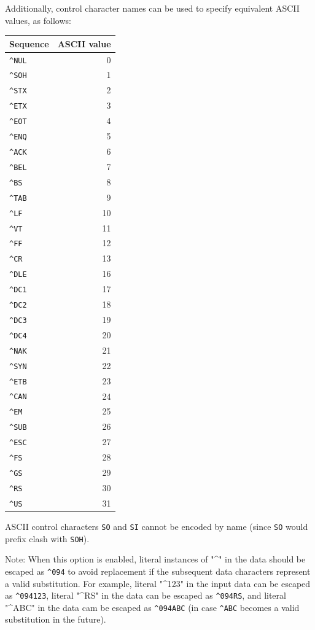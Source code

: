Additionally, control character names can be used to specify equivalent
ASCII values, as follows:

\begin{longtable}[]{@{}lr@{}}
\toprule()
Sequence & ASCII value \\
\midrule()
\endhead
\texttt{\^{}NUL} & 0 \\
\texttt{\^{}SOH} & 1 \\
\texttt{\^{}STX} & 2 \\
\texttt{\^{}ETX} & 3 \\
\texttt{\^{}EOT} & 4 \\
\texttt{\^{}ENQ} & 5 \\
\texttt{\^{}ACK} & 6 \\
\texttt{\^{}BEL} & 7 \\
\texttt{\^{}BS} & 8 \\
\texttt{\^{}TAB} & 9 \\
\texttt{\^{}LF} & 10 \\
\texttt{\^{}VT} & 11 \\
\texttt{\^{}FF} & 12 \\
\texttt{\^{}CR} & 13 \\
\texttt{\^{}DLE} & 16 \\
\texttt{\^{}DC1} & 17 \\
\texttt{\^{}DC2} & 18 \\
\texttt{\^{}DC3} & 19 \\
\texttt{\^{}DC4} & 20 \\
\texttt{\^{}NAK} & 21 \\
\texttt{\^{}SYN} & 22 \\
\texttt{\^{}ETB} & 23 \\
\texttt{\^{}CAN} & 24 \\
\texttt{\^{}EM} & 25 \\
\texttt{\^{}SUB} & 26 \\
\texttt{\^{}ESC} & 27 \\
\texttt{\^{}FS} & 28 \\
\texttt{\^{}GS} & 29 \\
\texttt{\^{}RS} & 30 \\
\texttt{\^{}US} & 31 \\
\bottomrule()
\end{longtable}

ASCII control characters \texttt{SO} and \texttt{SI} cannot be encoded
by name (since \texttt{SO} would prefix clash with \texttt{SOH}).

Note: When this option is enabled, literal instances of "\^{}" in the
data should be escaped as \texttt{\^{}094} to avoid replacement if the
subsequent data characters represent a valid substitution. For example,
literal "\^{}123" in the input data can be escaped as
\texttt{\^{}094123}, literal "\^{}RS" in the data can be escaped as
\texttt{\^{}094RS}, and literal "\^{}ABC" in the data cam be escaped as
\texttt{\^{}094ABC} (in case \texttt{\^{}ABC} becomes a valid
substitution in the future).

